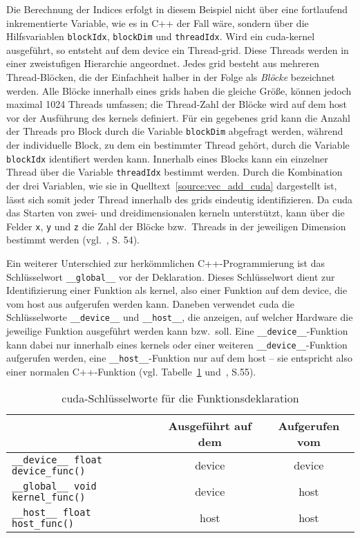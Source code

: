 Die Berechnung der Indices erfolgt in diesem Beispiel nicht über eine fortlaufend inkrementierte Variable, wie es in C++
der Fall wäre, sondern über die Hilfsvariablen \texttt{blockIdx}, \texttt{blockDim} und \texttt{threadIdx}. Wird ein
\gls{cuda}-\gls{kernel} ausgeführt, so entsteht auf dem \gls{device} ein Thread-\gls{grid}. Diese Threads werden in
einer zweistufigen Hierarchie angeordnet. Jedes \gls{grid} besteht aus mehreren Thread-Blöcken, die der Einfachheit
halber in der Folge als \textit{Blöcke} bezeichnet werden. Alle Blöcke innerhalb eines \gls{grid}s haben die gleiche
Größe, können jedoch maximal 1024 Threads umfassen; die Thread-Zahl der Blöcke wird auf dem \gls{host} vor der
Ausführung des \gls{kernel}s definiert. Für ein gegebenes \gls{grid} kann die Anzahl der Threads pro Block durch die 
Variable \texttt{blockDim} abgefragt werden, während der individuelle Block, zu dem ein bestimmter Thread gehört, durch
die Variable \texttt{blockIdx} identifiert werden kann. Innerhalb eines Blocks kann ein einzelner Thread über die
Variable \texttt{threadIdx} bestimmt werden. Durch die Kombination der drei Variablen, wie sie in
Quelltext~\ref{source:vec_add_cuda} dargestellt ist, lässt sich somit jeder Thread innerhalb des \gls{grid}s eindeutig
identifizieren. Da \gls{cuda} das Starten von zwei- und dreidimensionalen \gls{kernel}n unterstützt, kann über die
Felder \texttt{x}, \texttt{y} und \texttt{z} die Zahl der Blöcke bzw.\ Threads in der jeweiligen Dimension bestimmt
werden (vgl.~\cite{kirkhwu}, S. 54).

Ein weiterer Unterschied zur herkömmlichen C++-Programmierung ist das Schlüsselwort \texttt{\_\_global\_\_} vor der
Deklaration. Dieses Schlüsselwort dient zur Identifizierung einer Funktion als \gls{kernel}, also einer Funktion auf
dem \gls{device}, die vom \gls{host} aus aufgerufen werden kann. Daneben verwendet \gls{cuda} die Schlüsselworte
\texttt{\_\_device\_\_} und \texttt{\_\_host\_\_}, die anzeigen, auf welcher Hardware die jeweilige Funktion ausgeführt
werden kann bzw.\ soll. Eine \texttt{\_\_device\_\_}-Funktion kann dabei nur innerhalb eines \gls{kernel}s oder einer
weiteren \texttt{\_\_device\_\_}-Funktion aufgerufen werden, eine \texttt{\_\_host\_\_}-Funktion nur auf dem \gls{host}
-- sie entspricht also einer normalen C++-Funktion (vgl. Tabelle~\ref{table:cu_func_keywords} und~\cite{kirkhwu}, S.55).

\begin{table}
    \centering
    \begin{tabular}{| l | c | c |}
        \hline
        & Ausgeführt auf dem & Aufgerufen vom \\
        \hline
        \texttt{\_\_device\_\_ float device\_func()} & \gls{device} & \gls{device} \\
        \hline
        \texttt{\_\_global\_\_ void kernel\_func()} & \gls{device} & \gls{host} \\
        \hline
        \texttt{\_\_host\_\_ float host\_func()} & \gls{host} & \gls{host} \\
        \hline
    \end{tabular}
    \caption{\gls{cuda}-Schlüsselworte für die Funktionsdeklaration}
    \label{table:cu_func_keywords}
\end{table}

